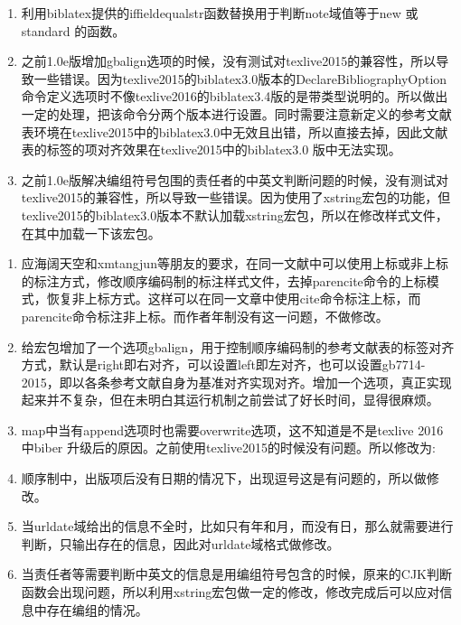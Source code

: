 \label{up:161231}
\begin{enumerate}
\item 利用biblatex提供的iffieldequalstr函数替换用于判断note域值等于new 或standard 的函数。

\item 之前1.0e版增加gbalign选项的时候，没有测试对texlive2015的兼容性，所以导致一些错误。因为texlive2015的biblatex3.0版本的DeclareBibliographyOption 命令定义选项时不像texlive2016的biblatex3.4版的是带类型说明的。所以做出一定的处理，把该命令分两个版本进行设置。同时需要注意新定义的参考文献表环境在texlive2015中的biblatex3.0中无效且出错，所以直接去掉，因此文献表的标签的项对齐效果在texlive2015中的biblatex3.0 版中无法实现。

\item 之前1.0e版解决编组符号包围的责任者的中英文判断问题的时候，没有测试对texlive2015的兼容性，所以导致一些错误。因为使用了xstring宏包的功能，但texlive2015的biblatex3.0版本不默认加载xstring宏包，所以在修改样式文件，在其中加载一下该宏包。
\begin{texlist}
\RequirePackage{xstring}%
\end{texlist}

\end{enumerate}

\label{up:161207}
\begin{enumerate}
\item 应海阔天空和xmtangjun等朋友的要求，在同一文献中可以使用上标或非上标的标注方式，修改顺序编码制的标注样式文件，去掉parencite命令的上标模式，恢复非上标方式。这样可以在同一文章中使用cite命令标注上标，而parencite命令标注非上标。而作者年制没有这一问题，不做修改。

\item 给宏包增加了一个选项gbalign，用于控制顺序编码制的参考文献表的标签对齐方式，默认是right即右对齐，可以设置left即左对齐，也可以设置gb7714-2015，即以各条参考文献自身为基准对齐实现对齐。增加一个选项，真正实现起来并不复杂，但在未明白其运行机制之前尝试了好长时间，显得很麻烦。


\item map中当有append选项时也需要overwrite选项，这不知道是不是texlive 2016 中biber 升级后的原因。之前使用texlive2015的时候没有问题。所以修改为:

\item 顺序制中，出版项后没有日期的情况下，出现逗号这是有问题的，所以做修改。

\item 当urldate域给出的信息不全时，比如只有年和月，而没有日，那么就需要进行判断，只输出存在的信息，因此对urldate域格式做修改。


\item 当责任者等需要判断中英文的信息是用编组符号包含的时候，原来的CJK判断函数会出现问题，所以利用xstring宏包做一定的修改，修改完成后可以应对信息中存在编组的情况。
\end{enumerate}

